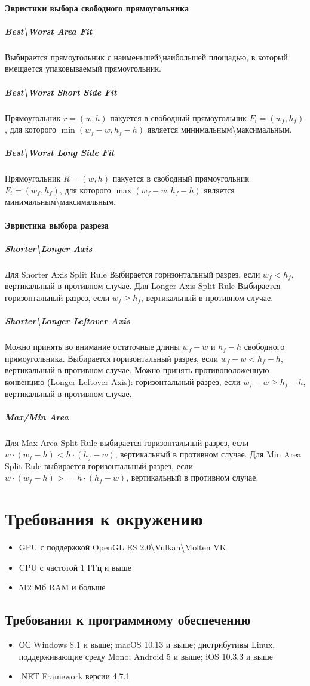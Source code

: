 \documentclass{fefu}
\begin{document}
\paragraph{Эвристики выбора свободного прямоугольника}
\subparagraph{Best\textbackslash Worst Area Fit}
Выбирается прямоугольник с наименьшей\textbackslash наибольшей площадью, в который вмещается упаковываемый прямоугольник.
\subparagraph{Best\textbackslash Worst Short Side Fit}
Прямоугольник $r = (w, h)$ пакуется в свободный прямоугольник $F_i = (w_f, h_f)$, для которого $\min (w_f - w, h_f - h)$ 
является минимальным\textbackslash максимальным.
\subparagraph{Best\textbackslash Worst Long Side Fit}
Прямоугольник $R = (w, h)$ пакуется в свободный прямоугольник $F_i = (w_f, h_f)$, для которого $\max (w_f - w, h_f - h)$ 
является минимальным\textbackslash максимальным.
\paragraph{Эвристика выбора разреза}
\subparagraph{Shorter\textbackslash Longer Axis}
Для Shorter Axis Split Rule Выбирается горизонтальный разрез, если $w_f < h_f$, вертикальный в противном случае.
Для Longer Axis Split Rule Выбирается горизонтальный разрез, если $w_f \geq h_f$, вертикальный в противном случае.
\subparagraph{Shorter\textbackslash Longer Leftover Axis}
Можно принять во внимание остаточные длины $w_f - w$ и $h_f - h$ свободного прямоугольника. 
Выбирается горизонтальный разрез, если $w_f - w < h_f - h$, вертикальный в противном случае. 
Можно принять противоположенную конвенцию (Longer Leftover Axis): горизонтальный разрез, если $w_f - w \geq h_f - h$, 
вертикальный в противном случае.
\subparagraph{Max/Min Area}
Для Max Area Split Rule выбирается горизонтальный разрез, если $w \cdot (w_f - h) < h \cdot (h_f - w)$, вертикальный в 
противном случае. Для Min Area Split Rule выбирается горизонтальный разрез, если $w \cdot (w_f - h) >= h \cdot (h_f - w)$, вертикальный в 
противном случае.
\section{Требования к окружению}
\begin{itemize}
    \item GPU с поддержкой OpenGL ES 2.0\textbackslash Vulkan\textbackslash Molten VK
    \item CPU с частотой 1 ГГц и выше
    \item 512 Мб RAM и больше
\end{itemize}
\subsection{Требования к программному обеспечению}
\begin{itemize}
    \item ОС Windows 8.1 и выше; macOS 10.13 и выше; дистрибутивы 
    Linux, поддерживающие среду Mono; Android 5 и выше; iOS 10.3.3 и выше
    \item .NET Framework версии 4.7.1
\end{itemize}
\end{document}
